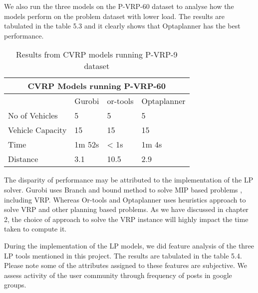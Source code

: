 We also run the three models on the P-VRP-60 dataset to analyse how the models perform on the problem dataset with lower
load.  The results are tabulated in the table 5.3 and it clearly shows that Optaplanner has the best performance.
\begin{table}[!ht]
\centering
\begin{tabular}{|l|l|l|l|}
\hline
\multicolumn{4}{|c|}{CVRP Models running P-VRP-60} \\ \hline
              & Gurobi         & or-tools       & Optaplanner    \\ \hline
No of Vehicles & 5               & 5              & 5            \\ \hline
Vehicle Capacity & 15               & 15              & 15             \\ \hline
Time          & 1m 52s  & < 1s  & 1m 4s \\ \hline
Distance      & 3.1           & 10.5          & 2.9           \\ \hline
\end{tabular}
\caption{Results from CVRP models running P-VRP-9 dataset}
\label{p60-table}
\end{table}

The disparity of performance may be attributed to the implementation of the LP solver.
Gurobi uses Branch and bound method to solve MIP based problems \cite{gurobi:mip}, including VRP. Whereas
 Or-tools and Optaplanner uses heuristics approach to solve VRP and other planning based problems. As we have
  discussed in chapter 2, the choice of approach to solve the VRP instance will highly impact the time taken to compute it.

During the implementation of the LP models, we did feature analysis of the three LP tools mentioned in this project.
The results are tabulated in the table 5.4. Please note some of the attributes assigned to these features are subjective.
We assess activity of the user community through frequency of posts in google groups.

